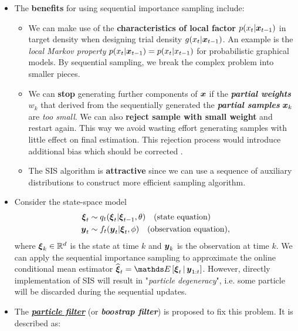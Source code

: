 \documentclass[11pt]{article}
\begin{document}
\begin{itemize}
\item The \textbf{benefits} for using sequential importance sampling include:
\begin{itemize}
\item We can make use of the \textbf{characteristics of local factor} $p(x_{t}| \boldsymbol{x}_{t-1})$ in target density when designing trial density $g(x_{t}| \boldsymbol{x}_{t-1})$. An example is the \emph{local Markov property} $p(x_{t}| \boldsymbol{x}_{t-1}) = p(x_{t}|x_{t-1})$ for probabilistic graphical models. By sequential sampling, we break the complex problem into smaller pieces.

\item We can \textbf{stop} generating further components of $\boldsymbol{x}$ if the \emph{\textbf{partial weights}} $w_{k}$ that derived from the sequentially generated the \emph{\textbf{partial samples}} $\boldsymbol{x}_{k}$ are \emph{too small}. We can also \textbf{reject sample with small weight} and restart again. This way we avoid wasting effort generating samples with little  effect on final estimation. This rejection process would introduce additional bias which should be corrected \citep{robert1999monte}.

\item The SIS algorithm is \textbf{attractive} since we can use a sequence of auxiliary distributions to construct more efficient sampling algorithm.
\end{itemize} 

\item Consider the state-space model 
\begin{align*}
\boldsymbol{\xi}_{t} &\sim q_{t}(\boldsymbol{\xi}_{t} | \boldsymbol{\xi}_{t-1}, \theta) \quad (\text{state equation})\\
\boldsymbol{y}_{t} &\sim f_{t}(\boldsymbol{y}_t | \boldsymbol{\xi}_{t}, \phi) \quad (\text{observation equation}),
\end{align*} where $\boldsymbol{\xi}_{k} \in {\mathbb R}^{d}$ is the state at time $k$ and $\boldsymbol{y}_{k}$ is the observation at time $k$. We can apply the sequential importance sampling to approximate the online conditional mean estimator $\widehat{\mb{\xi}}_{t} = \E{}{\mb{\xi}_{t} \,|\, \mb{y}_{1:t}}$. However, directly implementation of SIS will result in "\emph{particle degeneracy}", i.e. some particle will be discarded during the sequential updates.

\item The \underline{\emph{\textbf{particle filter}}} (or \emph{\textbf{boostrap filter}}) is proposed to fix this problem. It is described as: %
 

\end{itemize}
\end{document}
